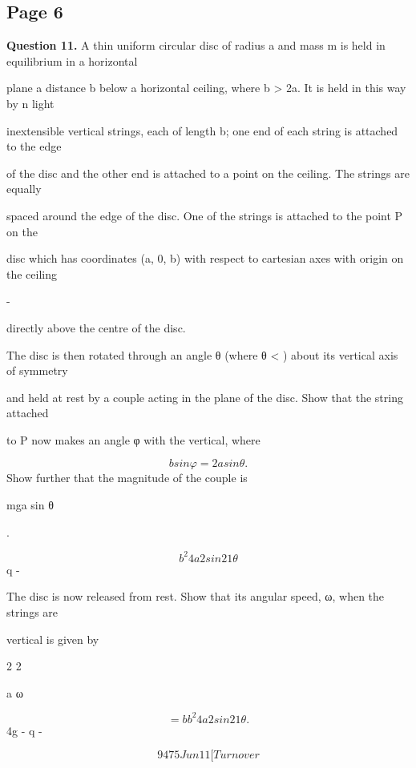 \documentclass[12pt]{article}
\begin{document}
\subsection*{Page 6}
\begin{flushleft}
\bigskip\textbf{Question 11.} A thin uniform circular disc of radius a and mass m is held in equilibrium in a horizontal\par
plane a distance b below a horizontal ceiling, where b > 2a. It is held in this way by n light\par
inextensible vertical strings, each of length b; one end of each string is attached to the edge\par
of the disc and the other end is attached to a point on the ceiling. The strings are equally\par
spaced around the edge of the disc. One of the strings is attached to the point P on the\par
disc which has coordinates (a, 0, b) with respect to cartesian axes with origin on the ceiling\par
-\par
directly above the centre of the disc.\par
The disc is then rotated through an angle θ (where θ < \pi) about its vertical axis of symmetry\par
and held at rest by a couple acting in the plane of the disc. Show that the string attached\par
to P now makes an angle φ with the vertical, where\par
\[b sin φ = 2a sin θ .\]
Show further that the magnitude of the couple is\par
mga sin θ\par
.\par
\[b^2 4a2 sin 2 1 θ\]
q -\par
The disc is now released from rest. Show that its angular speed, ω, when the strings are\par
vertical is given by\par
2 2\par
a ω\par
\[= b b^2 4a2 sin 2 1 θ .\]
4g - q -\par
\[9475 Jun11 [Turn over\]
\end{flushleft}
\end{document}
